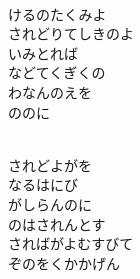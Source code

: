 \documentclass[10pt,b5j]{tarticle} %
\begin{document}
\begin{enumerate}
\begin{minipage}[c]{\blocksize}
        \vspace{\linespace}
        \item~\\
        けるのたくみよ\\
        されどりてしきのよ\\
        いみとれば\\
        などてくぎくの\\
        わなんのえを\\
        ののに
        
    \end{minipage}
    \begin{minipage}[c]{\blocksize}
        
        \vspace{\linespace}
        \item~\\
        されどよがを\\
        なるはにび\\
        がしらんのに\\
        のはされんとす\\
        さればがよむすびて\\
        ぞのをくかかげん
    
    \end{minipage}
\end{enumerate} %
\end{document}
